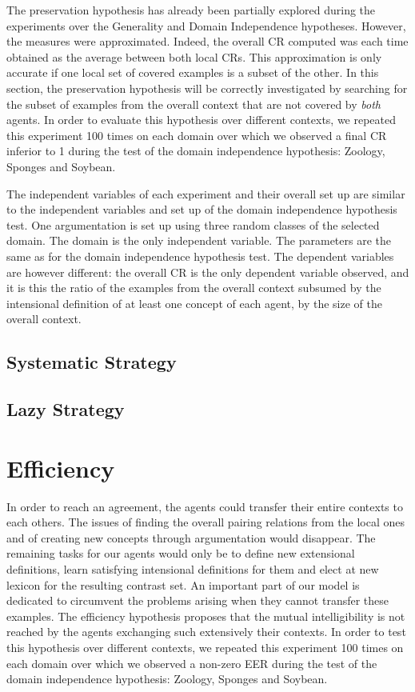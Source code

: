 The preservation hypothesis has already been partially explored during the experiments over the Generality and Domain Independence hypotheses. However, the measures were approximated. Indeed, the overall CR computed was each time obtained as the average between both local CRs. This approximation is only accurate if one local set of covered examples is a subset of the other. In this section, the preservation hypothesis will be correctly investigated by searching for the subset of examples from the overall context that are not covered by \emph{both} agents. In order to evaluate this hypothesis over different contexts, we repeated this experiment 100 times on each domain over which we observed a final CR inferior to 1 during the test of the domain independence hypothesis: Zoology, Sponges and Soybean.

The independent variables of each experiment and their overall set up are similar to the independent variables and set up of the domain independence hypothesis test. One argumentation is set up using three random classes of the selected domain. The domain is the only independent variable. The parameters are the same as for the domain independence hypothesis test. The dependent variables are however different: the overall CR is the only dependent variable observed, and it is this the ratio of the examples from the overall context subsumed by the intensional definition of at least one concept of each agent, by the size of the overall context.

\subsection{Systematic Strategy}

\subsection{Lazy Strategy}

\section{Efficiency}

In order to reach an agreement, the agents could transfer their entire contexts to each others. The issues of finding the overall pairing relations from the local ones and of creating new concepts through argumentation would disappear. The remaining tasks for our agents would only be to define new extensional definitions, learn satisfying intensional definitions for them and elect at new lexicon for the resulting contrast set. An important part of our model is dedicated to circumvent the problems arising when they cannot transfer these examples. The efficiency hypothesis proposes that the mutual intelligibility is not reached by the agents exchanging such extensively their contexts. In order to test this hypothesis over different contexts, we repeated this experiment 100 times on each domain over which we observed a non-zero EER during the test of the domain independence hypothesis: Zoology, Sponges and Soybean. 

